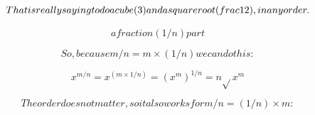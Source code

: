 \[That is really saying to do a cube (3) and a square root (\\frac{1}{2}), in any order.\]

\[a fraction (1/n) part\]

\[So, because m/n = m \times (1/n) we can do this:\]

\[x^{m/n} = x^{(m \times 1/n)} = (x^{m})^{1/n} = n\sqrt{}x^{m}\]

\[The order does not matter, so it also works for m/n = (1/n) \times m:\]

